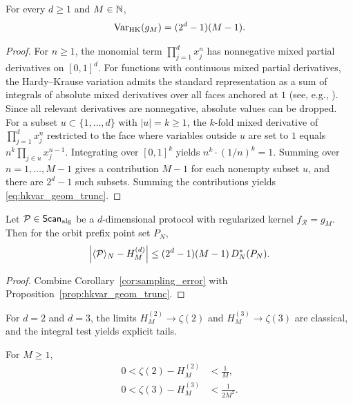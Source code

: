 \begin{proposition}
\label{prop:hkvar_geom_trunc}
For every $d\ge 1$ and $M\in\mathbb{N}$,
\begin{equation}
\label{eq:hkvar_geom_trunc}
\mathrm{Var}_{\mathrm{HK}}(g_M) = (2^d-1)(M-1).
\end{equation}
\end{proposition}

\begin{proof}
For $n\ge 1$, the monomial term $\prod_{j=1}^d x_j^n$ has nonnegative mixed partial derivatives on $[0,1]^d$. For functions with continuous mixed partial derivatives, the Hardy--Krause variation admits the standard representation as a sum of integrals of absolute mixed derivatives over all faces anchored at $1$ (see, e.g., \cite{Niederreiter1992,DickPillichshammer2010}). Since all relevant derivatives are nonnegative, absolute values can be dropped. For a subset $u\subset\{1,\dots,d\}$ with $|u|=k\ge 1$, the $k$-fold mixed derivative of $\prod_{j=1}^d x_j^n$ restricted to the face where variables outside $u$ are set to $1$ equals $n^k \prod_{j\in u} x_j^{n-1}$. Integrating over $[0,1]^k$ yields $n^k \cdot (1/n)^k = 1$. Summing over $n=1,\dots,M-1$ gives a contribution $M-1$ for each nonempty subset $u$, and there are $2^d-1$ such subsets. Summing the contributions yields \eqref{eq:hkvar_geom_trunc}.
\end{proof}

\begin{corollary}
\label{cor:gm_sampling_bound}
Let $\mathcal{P}\in\mathsf{Scan}_{\mathrm{alg}}$ be a $d$-dimensional protocol with regularized kernel $f_{\mathcal{R}}=g_M$. Then for the orbit prefix point set $P_N$,
\begin{equation}
\label{eq:gm_sampling_bound}
\left|\langle \mathcal{P} \rangle_N-H_M^{(d)}\right|
\le (2^d-1)(M-1)\,D_N^\ast(P_N).
\end{equation}
\end{corollary}

\begin{proof}
Combine Corollary~\ref{cor:sampling_error} with Proposition~\ref{prop:hkvar_geom_trunc}.
\end{proof}

For $d=2$ and $d=3$, the limits $H_M^{(2)}\to\zeta(2)$ and $H_M^{(3)}\to\zeta(3)$ are classical, and the integral test yields explicit tails.

\begin{proposition}
\label{prop:zeta_trunc_bounds}
For $M\ge 1$,
\begin{align}
\label{eq:zeta2_bound}
0<\zeta(2)-H_M^{(2)} &< \frac{1}{M},\\
\label{eq:zeta3_bound}
0<\zeta(3)-H_M^{(3)} &< \frac{1}{2M^2}.
\end{align}
\end{proposition}

